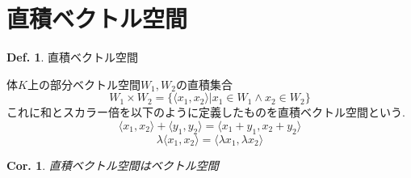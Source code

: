 \documentclass[a4paper,10pt,report]{amsart}
\theoremstyle{plain}
\newtheorem{cor}{Cor.}[section]
\theoremstyle{definition}
\newtheorem{defn}{Def.}[section]
\theoremstyle{remark}
\begin{document}
\section{直積ベクトル空間}
\begin{leftbar}
    \begin{defn}直積ベクトル空間\par
        体\(K\)上の部分ベクトル空間\(W_{1},W_{2}\)の直積集合
        \begin{equation}
            W_{1}\times{}W_{2}=\{\langle x_{1},x_{2}\rangle|x_{1}\in W_{1}\wedge x_{2}\in W_{2}\}
        \end{equation}
        これに和とスカラー倍を以下のように定義したものを直積ベクトル空間という. 
        \begin{equation}
            \langle x_{1},x_{2}\rangle+\langle y_{1},y_{2}\rangle=\langle x_{1}+y_{1},x_{2}+y_{2}\rangle
        \end{equation}
        \begin{equation}
            \lambda\langle x_{1},x_{2}\rangle=\langle\lambda{}x_{1},\lambda{}x_{2}\rangle
        \end{equation}
    \end{defn}
\end{leftbar}
\begin{leftbar}
    \begin{cor}
        直積ベクトル空間はベクトル空間
    \end{cor}
\end{leftbar}
\end{document}
